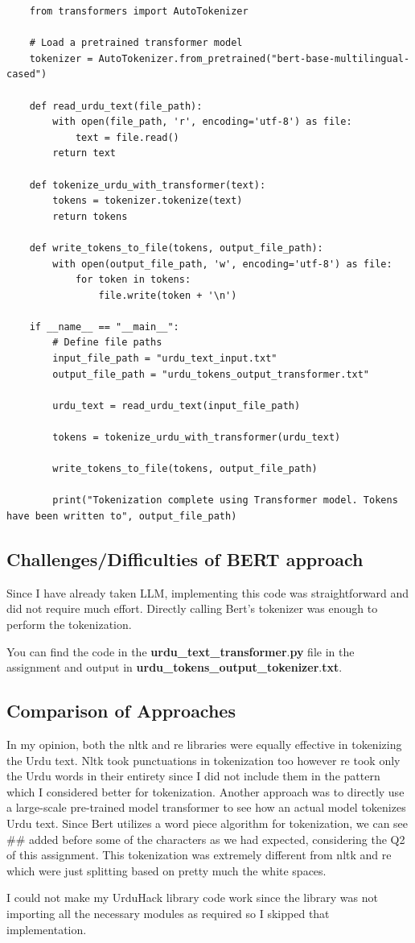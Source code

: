 \documentclass[a4paper,12pt]{article}
\begin{document}
\begin{lstlisting}
    from transformers import AutoTokenizer

    # Load a pretrained transformer model 
    tokenizer = AutoTokenizer.from_pretrained("bert-base-multilingual-cased")
    
    def read_urdu_text(file_path):
        with open(file_path, 'r', encoding='utf-8') as file:
            text = file.read()
        return text
    
    def tokenize_urdu_with_transformer(text):
        tokens = tokenizer.tokenize(text)
        return tokens
    
    def write_tokens_to_file(tokens, output_file_path):
        with open(output_file_path, 'w', encoding='utf-8') as file:
            for token in tokens:
                file.write(token + '\n')
    
    if __name__ == "__main__":
        # Define file paths
        input_file_path = "urdu_text_input.txt"
        output_file_path = "urdu_tokens_output_transformer.txt"
        
        urdu_text = read_urdu_text(input_file_path)
    
        tokens = tokenize_urdu_with_transformer(urdu_text)
    
        write_tokens_to_file(tokens, output_file_path)
    
        print("Tokenization complete using Transformer model. Tokens have been written to", output_file_path)
\end{lstlisting}

\subsection{Challenges/Difficulties of BERT approach}

Since I have already taken LLM, implementing this code was straightforward and did not require much effort. Directly calling Bert’s tokenizer was enough to perform the tokenization.

You can find the code in the \textbf{urdu\_text\_transformer$.$py} file in the assignment and output in \textbf{urdu\_tokens\_output\_tokenizer$.$txt}.

\subsection{Comparison of Approaches}

In my opinion, both the nltk and re libraries were equally effective in tokenizing the Urdu text. Nltk took punctuations in tokenization too however re took only the Urdu words in their entirety since I did not include them in the pattern which I considered better for tokenization. Another approach was to directly use a large-scale pre-trained model transformer to see how an actual model tokenizes Urdu text. Since Bert utilizes a word piece algorithm for tokenization, we can see \#\# added before some of the characters as we had expected, considering the Q2 of this assignment. This tokenization was extremely different from nltk and re which were just splitting based on pretty much the white spaces.

I could not make my UrduHack library code work since the library was not importing all the necessary modules as required so I skipped that implementation.
\end{document}
